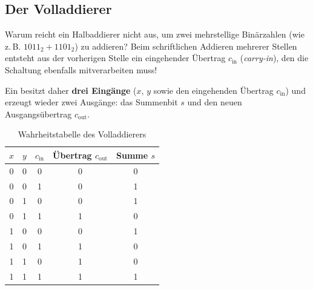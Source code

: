 \subsection{Der Volladdierer}

Warum reicht ein Halbaddierer nicht aus, um zwei mehrstellige Binärzahlen (wie z.\,B. $1011_2 + 1101_2$) zu addieren? Beim schriftlichen Addieren mehrerer Stellen entsteht aus der vorherigen Stelle ein eingehender Übertrag $c_{\text{in}}$ (\textit{carry-in}), den die Schaltung ebenfalls mitverarbeiten muss!

Ein  besitzt daher \textbf{drei Eingänge} ($x$, $y$ sowie den eingehenden Übertrag $c_{\text{in}}$) und erzeugt wieder zwei Ausgänge: das Summenbit $s$ und den neuen Ausgangsübertrag $c_{\text{out}}$.

\begin{table}[H]
    \centering
    \begin{tabular}{ccc||cc}
        $x$ & $y$ & $c_{\text{in}}$ & Übertrag $c_{\text{out}}$ & Summe $s$ \\ \midrule\midrule
        0 & 0 & 0 & 0 & 0 \\ \midrule
        0 & 0 & 1 & 0 & 1 \\ \midrule
        0 & 1 & 0 & 0 & 1 \\ \midrule
        0 & 1 & 1 & 1 & 0 \\ \midrule
        1 & 0 & 0 & 0 & 1 \\ \midrule
        1 & 0 & 1 & 1 & 0 \\ \midrule
        1 & 1 & 0 & 1 & 0 \\ \midrule
        1 & 1 & 1 & 1 & 1 \\
    \end{tabular}
    \caption{Wahrheitstabelle des Volladdierers}
    \label{tab:volladdierer_wahrheitstabelle}
\end{table}

